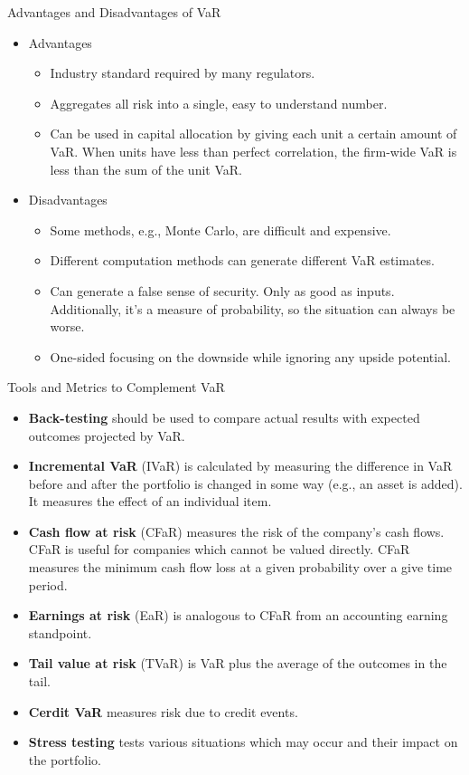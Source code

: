 \documentclass[../custom]{flashcards}
\newcommand{\studyArea}{Risk Management}
\begin{document}
\begin{flashcard}[\studyArea]{Advantages and Disadvantages of VaR}
    \begin{itemize}
        \item Advantages
        \begin{itemize}
            \item Industry standard required by many regulators.
            \item Aggregates all risk into a single, easy to understand number.
            \item Can be used in capital allocation by giving each unit a certain amount of VaR. When units have less than perfect correlation, the firm-wide VaR is less than the sum of the unit VaR.
        \end{itemize}
        \item Disadvantages
        \begin{itemize}
            \item Some methods, e.g., Monte Carlo, are difficult and expensive.
            \item Different computation methods can generate different VaR estimates.
            \item Can generate a false sense of security. Only as good as inputs. Additionally, it's a measure of probability, so the situation can always be worse.
            \item One-sided focusing on the downside while ignoring any upside potential.
        \end{itemize}
    \end{itemize}
\end{flashcard}

\begin{flashcard}[\studyArea]{Tools and Metrics to Complement VaR}
    \begin{itemize}
        \item \textbf{Back-testing} should be used to compare actual results with expected outcomes projected by VaR.
        \item \textbf{Incremental VaR} (IVaR) is calculated by measuring the difference in VaR before and after the portfolio is changed in some way (e.g., an asset is added). It measures the effect of an individual item.
        \item \textbf{Cash flow at risk} (CFaR) measures the risk of the company's cash flows. CFaR is useful for companies which cannot be valued directly. CFaR measures the minimum cash flow loss at a given probability over a give time period.
        \item \textbf{Earnings at risk} (EaR) is analogous to CFaR from an accounting earning standpoint.
        \item \textbf{Tail value at risk} (TVaR) is VaR plus the average of the outcomes in the tail.
        \item \textbf{Cerdit VaR} measures risk due to credit events.
        \item \textbf{Stress testing} tests various situations which may occur and their impact on the portfolio.
    \end{itemize}
\end{flashcard}
\end{document}
